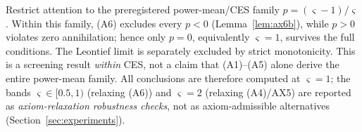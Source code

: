 \begin{corollary}
\label{cor:sigma-band}
Restrict attention to the preregistered power-mean/CES family
$p=(\varsigma-1)/\varsigma$. Within this family, \textup{(A6)} excludes every
$p<0$ (Lemma~\ref{lem:ax6b}), while $p>0$ violates zero annihilation; hence
only $p=0$, equivalently $\varsigma=1$, survives the full conditions. The
Leontief limit is separately excluded by strict monotonicity. This is a
screening result \emph{within} CES, not a claim that (A1)--(A5) alone derive
the entire power-mean family. All conclusions are therefore computed at
$\varsigma=1$; the bands $\varsigma\in[0.5,1)$ (relaxing \textup{(A6)}) and
$\varsigma=2$ (relaxing \textup{(A4)}/AX5) are reported as
\emph{axiom-relaxation robustness checks}, not as axiom-admissible
alternatives (Section~\ref{sec:experiments}).
\end{corollary}

